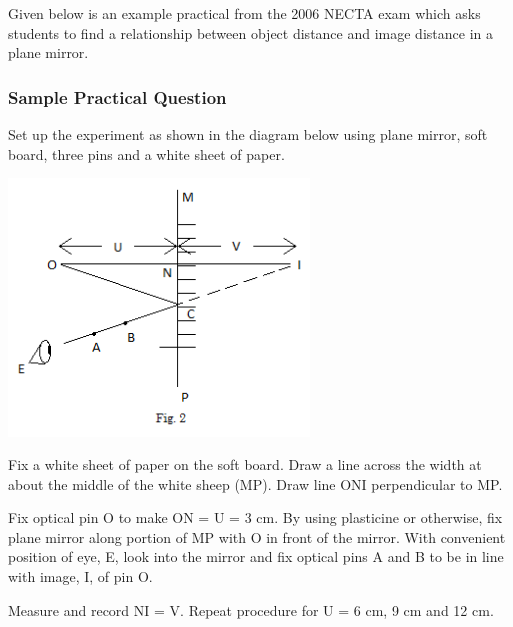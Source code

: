 Given below is an example practical from the 2006 NECTA exam which asks students to find a relationship between object distance and image distance in a plane mirror.

\subsubsection{Sample Practical Question}

Set up the experiment as shown in the diagram below using plane mirror, soft board, three pins and a white sheet of paper.

\begin{center}
\includegraphics[width=8cm]{./img/2006-2-alt.png}
\end{center}

Fix a white sheet of paper on the soft board. Draw a line across the width at about the middle of the white sheep (MP). Draw line ONI perpendicular to MP.

Fix optical pin O to make ON = U = 3 cm. By using plasticine or otherwise, fix plane mirror along portion of MP with O in front of the mirror. With convenient position of eye, E, look into the mirror and fix optical pins A and B to be in line with image, I, of pin O.

Measure and record NI = V. Repeat procedure for U = 6 cm, 9 cm and 12 cm.

